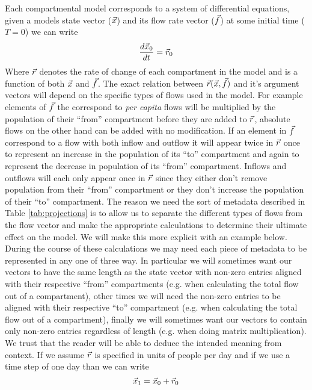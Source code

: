 Each compartmental model corresponds to a system of differential equations, given a models state vector ($\vec{x}$) and its flow rate vector ($\vec{f}$) at some initial time ($T=0$) we can write
\[
    \frac{d\vec{x}_0}{dt} = \vec{r}_0
\]
Where $\vec{r}$ denotes the rate of change of each compartment in the model and is a function of both $\vec{x}$ and $\vec{f}$. The exact relation between $\vec{r}(\vec{x}, \vec{f})$ and it's argument vectors will depend on the specific types of flows used in the model. For example elements of $\vec{f}$ the correspond to \emph{per capita} flows will be multiplied by the population of their ``from'' compartment before they are added to $\vec{r}$, absolute flows on the other hand can be added with no modification. If an element in $\vec{f}$ correspond to a flow with both inflow and outflow it will appear twice in $\vec{r}$ once to represent an increase in the population of its ``to'' compartment and again to represent the decrease in population of its ``from'' compartment. Inflows and outflows will each only appear once in $\vec{r}$ since they either don't remove population from their ``from'' compartment or they don't increase the population of their ``to'' compartment. The reason we need the sort of metadata described in Table \ref{tab:projections} is to allow us to separate the different types of flows from the flow vector and make the appropriate calculations to determine their ultimate effect on the model. We will make this more explicit with an example below. During the course of these calculations we may need each piece of metadata to be represented in any one of three way. In particular we will sometimes want our vectors to have the same length as the state vector with non-zero entries aligned with their respective ``from'' compartments (e.g. when calculating the total flow out of a compartment), other times we will need the non-zero entries to be aligned with their respective ``to'' compartment (e.g. when calculating the total flow out of a compartment), finally we will sometimes want our vectors to contain only non-zero entries regardless of length (e.g. when doing matrix multiplication). We trust that the reader will be able to deduce the intended meaning from context.  If we assume $\vec{r}$ is specified in units of people per day and if we use a time step of one day than we can write
\[
    \vec{x}_1 = \vec{x}_0 + \vec{r}_0
\]

